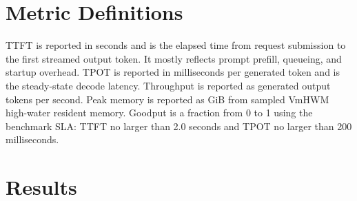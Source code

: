 \documentclass[11pt,a4paper]{article}
\begin{document}
\section{Metric Definitions}

TTFT is reported in seconds and is the elapsed time from request submission to
the first streamed output token. It mostly reflects prompt prefill, queueing,
and startup overhead. TPOT is reported in milliseconds per generated token and
is the steady-state decode latency. Throughput is reported as generated output
tokens per second. Peak memory is reported as GiB from sampled VmHWM high-water
resident memory. Goodput is a fraction from 0 to 1 using the benchmark SLA:
TTFT no larger than 2.0 seconds and TPOT no larger than 200 milliseconds.

\section{Results}
\end{document}
